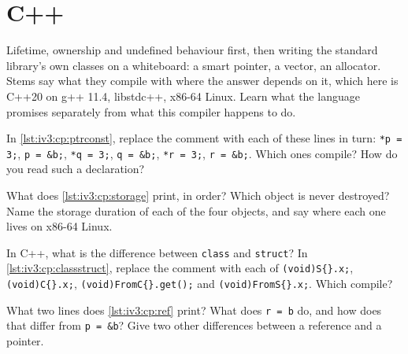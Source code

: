 \chapter{C++}\label{ch:iv3:cpp}

\begin{ivtrains}
Lifetime, ownership and undefined behaviour first, then writing the standard library's own classes on a whiteboard: a smart pointer, a vector, an allocator. Stems say what they compile with where the answer depends on it, which here is C++20 on g++ 11.4, libstdc++, x86-64 Linux. Learn what the language promises separately from what this compiler happens to do.
\end{ivtrains}

\begin{question}\label{iq:iv3:cpp:1}
In \cref{lst:iv3:cp:ptrconst}, replace the comment with each of these lines in turn: \texttt{*p = 3;}, \texttt{p = \&b;}, \texttt{*q = 3;}, \texttt{q = \&b;}, \texttt{*r = 3;}, \texttt{r = \&b;}. Which ones compile? How do you read such a declaration?
\label{lst:iv3:cp:ptrconst}
\end{question}

\begin{question}\label{iq:iv3:cpp:2}
What does \cref{lst:iv3:cp:storage} print, in order? Which object is never destroyed? Name the storage duration of each of the four objects, and say where each one lives on x86-64 Linux.
\label{lst:iv3:cp:storage}
\end{question}

\begin{question}\label{iq:iv3:cpp:3}
In C++, what is the difference between \texttt{class} and \texttt{struct}? In \cref{lst:iv3:cp:classstruct}, replace the comment with each of \texttt{(void)S\{\}.x;}, \texttt{(void)C\{\}.x;}, \texttt{(void)FromC\{\}.get();} and \texttt{(void)FromS\{\}.x;}. Which compile?
\label{lst:iv3:cp:classstruct}
\end{question}

\begin{question}\label{iq:iv3:cpp:4}
What two lines does \cref{lst:iv3:cp:ref} print? What does \texttt{r = b} do, and how does that differ from \texttt{p = \&b}? Give two other differences between a reference and a pointer.
\label{lst:iv3:cp:ref}
\end{question}


